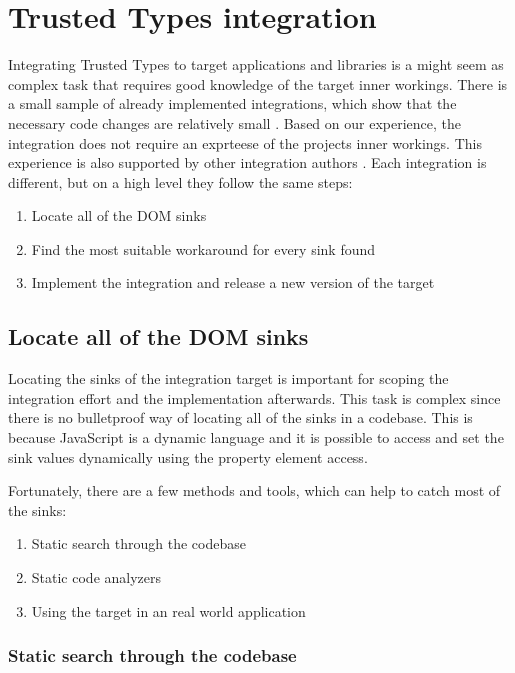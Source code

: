 \chapter{Trusted Types integration}
\label{tt_integration_setup}

Integrating Trusted Types to target applications and libraries is a might seem as complex task that
requires good knowledge of the target inner workings. There is a small sample of already implemented
integrations, which show that the necessary code changes are relatively small
\cite{tt_integration_list}. Based on our experience, the integration does not require an exprteese
of the projects inner workings. This experience is also supported by other integration authors
\cite{tt_web_framework_paper}. Each integration is different, but on a high level they follow the
same steps:

\begin{enumerate}
  \item Locate all of the DOM sinks
  \item Find the most suitable workaround for every sink found
  \item Implement the integration and release a new version of the target
\end{enumerate}

\section{Locate all of the DOM sinks}

Locating the sinks of the integration target is important for scoping the integration effort and the
implementation afterwards. This task is complex since there is no bulletproof way of locating all of
the sinks in a codebase. This is because JavaScript is a dynamic language and it is possible to
access and set the sink values dynamically using the property element access.

Fortunately, there are a few methods and tools, which can help to catch most of the sinks:

\begin{enumerate}
  \item Static search through the codebase
  \item Static code analyzers
  \item Using the target in an real world application
\end{enumerate}

\subsection{Static search through the codebase}

